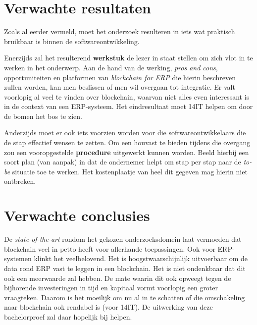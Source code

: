 \section{Verwachte resultaten}
\label{sec:verwachte_resultaten}

Zoals al eerder vermeld, moet het onderzoek resulteren in iets wat praktisch bruikbaar is binnen de softwareontwikkeling. 

Enerzijds zal het resulterend \textbf{werkstuk} de lezer in staat stellen om zich vlot in te werken in het onderwerp. Aan de hand van de werking, \textit{pros and cons}, opportuniteiten en platformen van \textit{blockchain for ERP} die hierin beschreven zullen worden, kan men beslissen of men wil overgaan tot integratie. Er valt voorlopig al veel te vinden over blockchain, waarvan niet alles even interessant is in de context van een ERP-systeem. Het eindresultaat moet 14IT helpen om door de bomen het bos te zien.

Anderzijds moet er ook iets voorzien worden voor die softwareontwikkelaars die de stap effectief wensen te zetten. Om een houvast te bieden tijdens die overgang zou een vooropgestelde \textbf{procedure} uitgewerkt kunnen worden. Beeld hierbij een soort plan (van aanpak) in dat de ondernemer helpt om stap per stap naar de \textit{to-be} situatie toe te werken. Het kostenplaatje van heel dit gegeven mag hierin niet ontbreken.


\section{Verwachte conclusies}
\label{sec:verwachte_conclusies}

De \emph{state-of-the-art} rondom het gekozen onderzoeksdomein laat vermoeden dat blockchain veel in petto heeft voor allerhande toepassingen. Ook voor ERP-systemen klinkt het veelbelovend. Het is hoogstwaarschijnlijk uitvoerbaar om de data rond ERP vast te leggen in een blockchain. Het is niet ondenkbaar dat dit ook een meerwaarde zal hebben. De mate waarin dit ook opweegt tegen de bijhorende investeringen in tijd en kapitaal vormt voorlopig een groter vraagteken. Daarom is het moeilijk om nu al in te schatten of die omschakeling naar blockchain ook rendabel is (voor 14IT). De uitwerking van deze bachelorproef zal daar hopelijk bij helpen.

